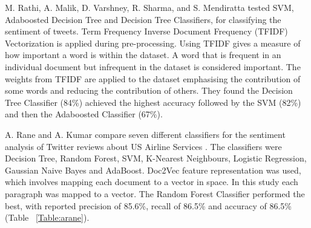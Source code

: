 M. Rathi, A. Malik, D. Varshney, R. Sharma, and S. Mendiratta \cite{Raithi2018} tested SVM, Adaboosted Decision Tree and Decision Tree Classifiers, for classifying the sentiment of tweets. Term Frequency Inverse Document Frequency (TFIDF) Vectorization is applied during pre-processing. Using TFIDF gives a measure of how important a word is within the dataset. A word that is frequent in an individual document but infrequent in the dataset is considered important. The weights from TFIDF are applied to the dataset emphasising the contribution of some words and reducing the contribution of others. They found the Decision Tree Classifier (84\%) achieved the highest accuracy followed by the SVM (82\%) and then the Adaboosted Classifier (67\%).

\begin{table}[h!]
\centering
\caption{Accuracy of Classifier Results from the study by A. Rane and A. Kumar \cite{Rane2018}.}
\label{Table:arane}
\setlength\extrarowheight{5pt}
\end{table}

A. Rane and A. Kumar compare seven different classifiers for the sentiment analysis of Twitter reviews about US Airline Services \cite{Rane2018}. The classifiers were Decision Tree, Random Forest, SVM, K-Nearest Neighbours, Logistic Regression, Gaussian Naive Bayes and AdaBoost. Doc2Vec feature representation was used, which involves mapping each document to a vector in space. In this study each paragraph was mapped to a vector. The Random Forest Classifier performed the best, with reported precision of 85.6\%, recall of 86.5\% and accuracy of 86.5\% (Table ~\ref{Table:arane}). 

